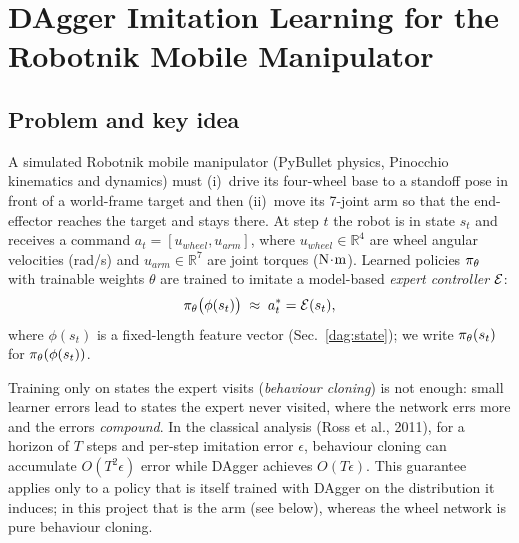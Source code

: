 \section{DAgger Imitation Learning for the Robotnik Mobile Manipulator}
\label{dag:sec}

\subsection{Problem and key idea}
\label{dag:problem}

A simulated Robotnik mobile manipulator (PyBullet physics, Pinocchio kinematics and dynamics) must (i)~drive its four-wheel base to a standoff pose in front of a world-frame target and then (ii)~move its 7-joint arm so that the end-effector reaches the target and stays there. At step $t$ the robot is in state $s_t$ and receives a command $a_t=[u_{wheel},u_{arm}]$, where $u_{wheel}\in\mathbb{R}^4$ are wheel angular velocities (rad/s) and $u_{arm}\in\mathbb{R}^7$ are joint torques ($\mathrm{N\!\cdot\!m}$). Learned policies $\pi_\theta$ with trainable weights $\theta$ are trained to imitate a model-based \emph{expert controller} $\mathcal{E}$:
\begin{equation}
  \pi_\theta\bigl(\phi(s_t)\bigr)\;\approx\;a_t^{*}=\mathcal{E}(s_t),
  \label{dag:goal}
\end{equation}
where $\phi(s_t)$ is a fixed-length feature vector (Sec.~\ref{dag:state}); we write $\pi_\theta(s_t)$ for $\pi_\theta(\phi(s_t))$.

Training only on states the expert visits (\emph{behaviour cloning}) is not enough: small learner errors lead to states the expert never visited, where the network errs more and the errors \emph{compound}. In the classical analysis (Ross et al., 2011), for a horizon of $T$ steps and per-step imitation error $\epsilon$, behaviour cloning can accumulate $O(T^{2}\epsilon)$ error while DAgger achieves $O(T\epsilon)$. This guarantee applies only to a policy that is itself trained with DAgger on the distribution it induces; in this project that is the arm (see below), whereas the wheel network is pure behaviour cloning.


